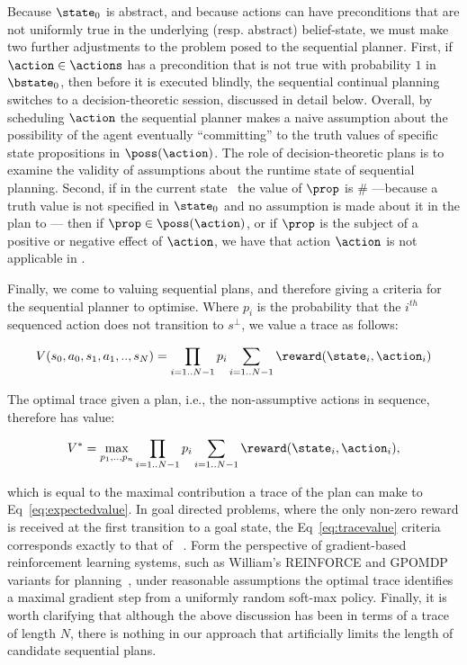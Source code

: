 Because $\state_0$ is abstract, and because actions can have
preconditions that are not uniformly true in the underlying
(resp. abstract) belief-state, we must make two further adjustments to
the problem posed to the sequential planner. First, if
$\action\in\actions$ has a precondition that is not true with
probability $1$ in $\bstate_0$, then before it is executed blindly,
the sequential continual planning switches to a decision-theoretic
session, discussed in detail below. Overall, by scheduling $\action$
the sequential planner makes a naive assumption about the possibility
of the agent eventually ``committing'' to the truth values of specific
state propositions in $\poss(\action)$. The role of decision-theoretic
plans is to examine the validity of assumptions about the runtime
state of sequential planning. Second, if in the current state \state\
the value of $\prop$ is $\#$ ---because a truth value is not specified
in $\state_0$ and no assumption is made about it in the plan
to \state--- then if $\prop \in \poss(\action)$, or if $\prop$ is the
subject of a positive or negative effect of $\action$, we have that
action $\action$ is not applicable in \state.

Finally, we come to valuing sequential plans, and therefore giving a
criteria for the sequential planner to optimise. Where $p_i$ is the
probability that the $i^{th}$ sequenced action does not transition to
$s^\bot$, we value a trace as follows:

\begin{equation}\label{eq:tracevalue}
V(s_0, a_0, s_1, a_1,.., s_N) =  \prod_{i=1..N-1} p_i \sum_{i=1..N-1} \reward(\state_i, \action_i)
\end{equation}

\noindent The optimal trace given a plan, i.e., the non-assumptive
actions in sequence, therefore has value:

\[
V^* = \max_{p_1, .., p_n} \prod_{i=1..N-1} p_i \sum_{i=1..N-1}
\reward(\state_i, \action_i),
\]

\noindent which is equal to the maximal contribution a trace of the plan can
make to Eq~\ref{eq:expectedvalue}. %
In goal directed problems, where the only non-zero reward is received
at the first transition to a goal state, the Eq~\ref{eq:tracevalue}
criteria corresponds exactly to that of
~\cite{yoon:etal:2007}. Form the perspective of
gradient-based reinforcement learning systems, such as William's
REINFORCE and GPOMDP variants for planning~\cite{olivier:doug:2009},
under reasonable assumptions the optimal trace identifies a maximal
gradient step from a uniformly random soft-max policy. Finally, it is
worth clarifying that although the above discussion has been in terms
of a trace of length $N$, there is nothing in our approach that
artificially limits the length of candidate sequential plans.


